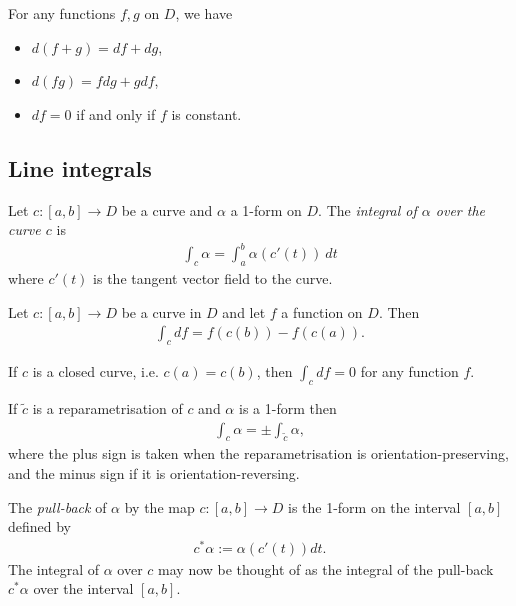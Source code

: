 \documentclass{article}
\begin{document}
\begin{proposition}
    For any functions $f,g$ on $D$, we have 
    \begin{itemize}
        \item $d(f+g)=df + dg$,
        \item $d(fg) =fdg + gdf$,
        \item $df=0$ if and only if $f$ is constant.
    \end{itemize}
\end{proposition}

\subsection{Line integrals}

\begin{definition}
    Let $c:[a,b]\to D$ be a curve and $\alpha$ a 1-form on $D$. The \emph{integral of $\alpha$ over
    the curve $c$} is 
    \begin{align*}
        \int_c \alpha = \int_a^b \alpha(c'(t))\:dt
    \end{align*}
    where $c'(t)$ is the tangent vector field to the curve.
\end{definition}

\begin{proposition}
    Let $c:[a,b]\to D$ be a curve in $D$ and let $f$ a function on $D$. Then
    \begin{align*}
        \int_c df = f(c(b)) - f(c(a)).
    \end{align*}
\end{proposition}

\begin{corollary}
    If $c$ is a closed curve, i.e. $c(a)=c(b)$, then $\int_c df = 0$ for any function $f$.
\end{corollary}

\begin{proposition}
    If $\tilde c$ is a reparametrisation of $c$ and $\alpha$ is a 1-form then 
    \begin{align*}
        \int_c \alpha = \pm \int_{\tilde c} \alpha,
    \end{align*}
    where the plus sign is taken when the reparametrisation is orientation-preserving,
    and the minus sign if it is orientation-reversing.
\end{proposition}

\begin{definition}
    The \emph{pull-back} of $\alpha$ by the map $c:[a,b]\to D$ is the 1-form on the
    interval $[a,b]$ defined by
    \begin{align*}
        c^*\alpha :=  \alpha(c'(t))dt.
    \end{align*}
    The integral of $\alpha$ over $c$ may now be thought of as the integral of the pull-back 
    $c^*\alpha$ over the interval $[a,b]$.
\end{definition}
\end{document}
